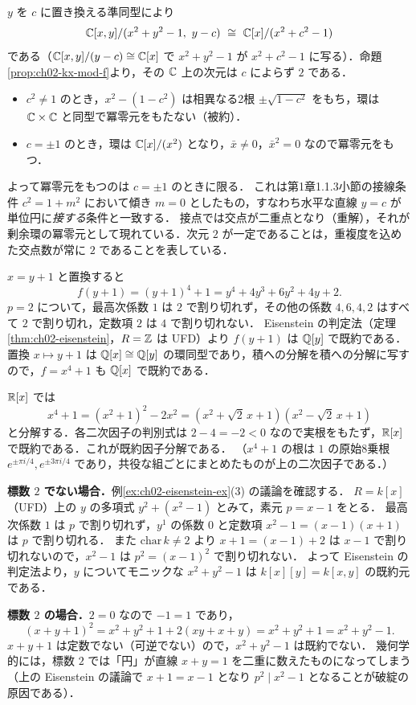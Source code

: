 $y$ を $c$ に置き換える準同型により
\[
  \C[x,y]/(x^2+y^2-1,\ y-c)\ \cong\ \C[x]/(x^2+c^2-1)
\]
である（$\mathbb{C}[x,y]/(y-c)\cong\mathbb{C}[x]$ で $x^2+y^2-1$ が $x^2+c^2-1$ に写る）．命題\ref{prop:ch02-kx-mod-f}より，その $\mathbb{C}$ 上の次元は $c$ によらず $2$ である．
\begin{itemize}
  \item $c^2\ne1$ のとき，$x^2-(1-c^2)$ は相異なる2根 $\pm\sqrt{1-c^2}$ をもち，環は $\mathbb{C}\times\mathbb{C}$ と同型で冪零元をもたない（被約）．
  \item $c=\pm1$ のとき，環は $\mathbb{C}[x]/(x^2)$ となり，$\bar x\ne0$，$\bar x^2=0$ なので冪零元をもつ．
\end{itemize}
よって冪零元をもつのは $c=\pm1$ のときに限る．
これは第1章1.1.3小節の接線条件 $c^2=1+m^2$ において傾き $m=0$ としたもの，すなわち水平な直線 $y=c$ が単位円に\emph{接する}条件と一致する．
接点では交点が二重点となり（重解），それが剰余環の冪零元として現れている．次元 $2$ が一定であることは，重複度を込めた交点数が常に $2$ であることを表している．

$x=y+1$ と置換すると
\[
  f(y+1)=(y+1)^4+1=y^4+4y^3+6y^2+4y+2.
\]
$p=2$ について，最高次係数 $1$ は $2$ で割り切れず，その他の係数 $4,6,4,2$ はすべて $2$ で割り切れ，定数項 $2$ は $4$ で割り切れない．
Eisenstein の判定法（定理\ref{thm:ch02-eisenstein}，$R=\mathbb{Z}$ は UFD）より $f(y+1)$ は $\mathbb{Q}[y]$ で既約である．
置換 $x\mapsto y+1$ は $\mathbb{Q}[x]\cong\mathbb{Q}[y]$ の環同型であり，積への分解を積への分解に写すので，$f=x^4+1$ も $\mathbb{Q}[x]$ で既約である．

$\mathbb{R}[x]$ では
\[
  x^4+1=(x^2+1)^2-2x^2=(x^2+\sqrt2\,x+1)(x^2-\sqrt2\,x+1)
\]
と分解する．各二次因子の判別式は $2-4=-2<0$ なので実根をもたず，$\mathbb{R}[x]$ で既約である．これが既約因子分解である．
（$x^4+1$ の根は $1$ の原始8乗根 $e^{\pm\pi i/4},e^{\pm3\pi i/4}$ であり，共役な組ごとにまとめたものが上の二次因子である．）

\textbf{標数 $2$ でない場合．}例\ref{ex:ch02-eisenstein-ex}(3) の議論を確認する．
$R=k[x]$（UFD）上の $y$ の多項式 $y^2+(x^2-1)$ とみて，素元 $p=x-1$ をとる．
最高次係数 $1$ は $p$ で割り切れず，$y^1$ の係数 $0$ と定数項 $x^2-1=(x-1)(x+1)$ は $p$ で割り切れる．
また $\mathrm{char}\,k\ne2$ より $x+1=(x-1)+2$ は $x-1$ で割り切れないので，$x^2-1$ は $p^2=(x-1)^2$ で割り切れない．
よって Eisenstein の判定法より，$y$ についてモニックな $x^2+y^2-1$ は $k[x][y]=k[x,y]$ の既約元である．

\textbf{標数 $2$ の場合．}$2=0$ なので $-1=1$ であり，
\[
  (x+y+1)^2=x^2+y^2+1+2(xy+x+y)=x^2+y^2+1=x^2+y^2-1.
\]
$x+y+1$ は定数でない（可逆でない）ので，$x^2+y^2-1$ は既約でない．
幾何学的には，標数 $2$ では「円」が直線 $x+y=1$ を二重に数えたものになってしまう（上の Eisenstein の議論で $x+1=x-1$ となり $p^2\mid x^2-1$ となることが破綻の原因である）．

